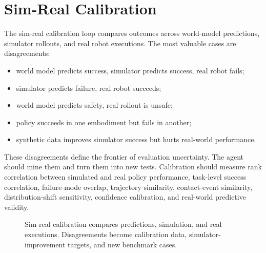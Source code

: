 \documentclass[sigconf,review,anonymous]{acmart}
\begin{document}
\section{Sim-Real Calibration}

The sim-real calibration loop compares outcomes across world-model predictions, simulator rollouts, and real robot executions. The most valuable cases are disagreements:

\begin{itemize}[leftmargin=*]
  \item world model predicts success, simulator predicts success, real robot fails;
  \item simulator predicts failure, real robot succeeds;
  \item world model predicts safety, real rollout is unsafe;
  \item policy succeeds in one embodiment but fails in another;
  \item synthetic data improves simulator success but hurts real-world performance.
\end{itemize}

These disagreements define the frontier of evaluation uncertainty. The agent should mine them and turn them into new tests. Calibration should measure rank correlation between simulated and real policy performance, task-level success correlation, failure-mode overlap, trajectory similarity, contact-event similarity, distribution-shift sensitivity, confidence calibration, and real-world predictive validity.

\begin{figure}[t]
  \centering
  \caption{Sim-real calibration compares predictions, simulation, and real executions. Disagreements become calibration data, simulator-improvement targets, and new benchmark cases.}
  \label{fig:sim-real}
\end{figure}
\end{document}
